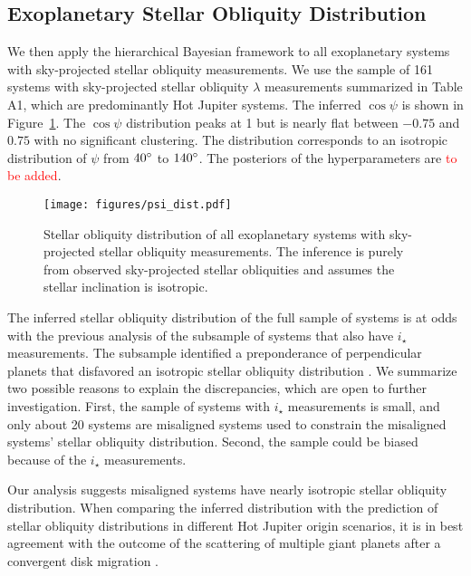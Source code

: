 \documentclass[twocolumn,times]{aastex631}
\newcommand{\numall}{161\xspace}
\begin{document}
\subsection{Exoplanetary Stellar Obliquity Distribution}

We then apply the hierarchical Bayesian framework to all exoplanetary systems with sky-projected stellar obliquity measurements. We use the sample of \numall systems with sky-projected stellar obliquity $\lambda$ measurements summarized in \cite{Albrecht22} Table A1, which are predominantly Hot Jupiter systems. The inferred $\cos{\psi}$ is shown in Figure~\ref{fig:psi_dist}. The $\cos{\psi}$ distribution peaks at 1 but is nearly flat between $-0.75$ and $0.75$ with no significant clustering. The distribution corresponds to an isotropic distribution of $\psi$ from $40\mbox{$^\circ$}$ to $140\mbox{$^\circ$}$. 
The posteriors of the hyperparameters are \textcolor{red}{to be added}.

\begin{figure}[ht!]
    \begin{centering}
        \texttt{[image: figures/psi\_dist.pdf]}
        \caption{Stellar obliquity distribution of all exoplanetary systems with sky-projected stellar obliquity measurements. The inference is purely from observed sky-projected stellar obliquities and assumes the stellar inclination is isotropic.}
        \label{fig:psi_dist}
    \end{centering}
\end{figure}

The inferred stellar obliquity distribution of the full sample of systems is at odds with the previous analysis of the subsample of systems that also have $i_\star$ measurements. The subsample identified a preponderance of perpendicular planets that disfavored an isotropic stellar obliquity distribution \citep{Albrecht21}. We summarize two possible reasons to explain the discrepancies, which are open to further investigation.
First, the sample of systems with $i_\star$ measurements is small, and only about 20 systems are misaligned systems used to constrain the misaligned systems' stellar obliquity distribution. Second, the sample could be biased because of the $i_\star$ measurements.

Our analysis suggests misaligned systems have nearly isotropic stellar obliquity distribution. When comparing the inferred distribution with the prediction of stellar obliquity distributions in different Hot Jupiter origin scenarios, it is in best agreement with the outcome of the scattering of multiple giant planets after a convergent disk migration \citep{Beague12}.
\end{document}
